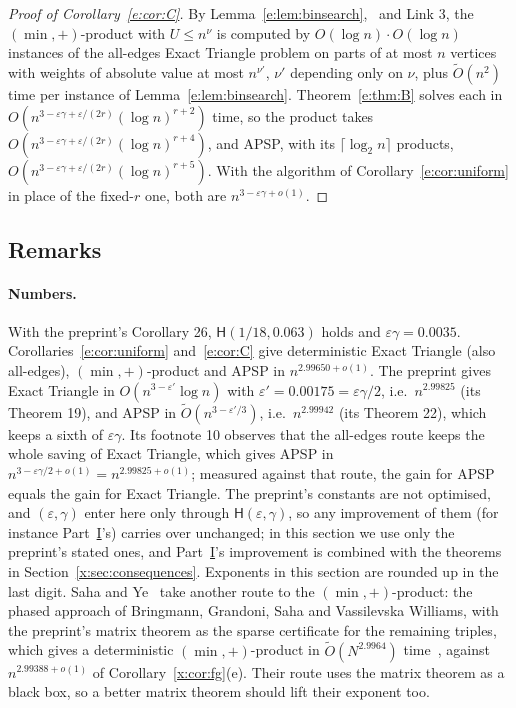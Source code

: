 \documentclass[11pt]{article}
\theoremstyle{definition}
\theoremstyle{remark}
\newcommand{\Hyp}{\mathsf{H}}
\newcommand{\ExpAPSPBest}{2.99388}%
\newcommand{\MinPlusSahaYe}{2.9964}%
\begin{document}
\begin{proof}[Proof of Corollary~\ref{e:cor:C}]
By Lemma~\ref{e:lem:binsearch},~\cite[Lemma~9.2]{CVX23} and Link 3, the $(\min,+)$-product with $U\le n^\nu$ is computed by $O(\log n)\cdot O(\log n)$ instances of the all-edges Exact Triangle problem on parts of at most $n$ vertices with weights of absolute value at most $n^{\nu'}$, $\nu'$ depending only on $\nu$, plus $\tilde O(n^2)$ time per instance of Lemma~\ref{e:lem:binsearch}. Theorem~\ref{e:thm:B} solves each in $O(n^{3-\varepsilon\gamma+\varepsilon/(2r)}(\log n)^{r+2})$ time, so the product takes $O(n^{3-\varepsilon\gamma+\varepsilon/(2r)}(\log n)^{r+4})$, and APSP, with its $\lceil\log_2n\rceil$ products, $O(n^{3-\varepsilon\gamma+\varepsilon/(2r)}(\log n)^{r+5})$. With the algorithm of Corollary~\ref{e:cor:uniform} in place of the fixed-$r$ one, both are $n^{3-\varepsilon\gamma+o(1)}$.
\end{proof}

\subsection{Remarks}\label{e:sec:numbers}

\paragraph{Numbers.} With the preprint's Corollary 26, $\Hyp(1/18,0.063)$ holds and $\varepsilon\gamma=0.0035$. Corollaries~\ref{e:cor:uniform} and~\ref{e:cor:C} give deterministic Exact Triangle (also all-edges), $(\min,+)$-product and APSP in $n^{2.99650+o(1)}$. The preprint gives Exact Triangle in $O(n^{3-\varepsilon'}\log n)$ with $\varepsilon'=0.00175=\varepsilon\gamma/2$, i.e.\ $n^{2.99825}$ (its Theorem 19), and APSP in $\tilde O(n^{3-\varepsilon'/3})$, i.e.\ $n^{2.99942}$ (its Theorem 22), which keeps a sixth of $\varepsilon\gamma$. Its footnote 10 observes that the all-edges route keeps the whole saving of Exact Triangle, which gives APSP in $n^{3-\varepsilon\gamma/2+o(1)}=n^{2.99825+o(1)}$; measured against that route, the gain for APSP equals the gain for Exact Triangle. The preprint's constants are not optimised, and $(\varepsilon,\gamma)$ enter here only through $\Hyp(\varepsilon,\gamma)$, so any improvement of them (for instance Part~\hyperref[m:partI]{I}'s) carries over unchanged; in this section we use only the preprint's stated ones, and Part~\hyperref[m:partI]{I}'s improvement is combined with the theorems in Section~\ref{x:sec:consequences}. Exponents in this section are rounded up in the last digit.
Saha and Ye~\cite{SY26} take another route to the $(\min,+)$-product: the phased approach of Bringmann, Grandoni, Saha and Vassilevska Williams, with the preprint's matrix theorem as the sparse certificate for the remaining triples, which gives a deterministic $(\min,+)$-product in $\tilde O(N^{\MinPlusSahaYe})$ time~\cite[Theorem~1.3]{SY26}, against $n^{\ExpAPSPBest+o(1)}$ of Corollary~\ref{x:cor:fg}(e).
Their route uses the matrix theorem as a black box, so a better matrix theorem should lift their exponent too.
\end{document}
